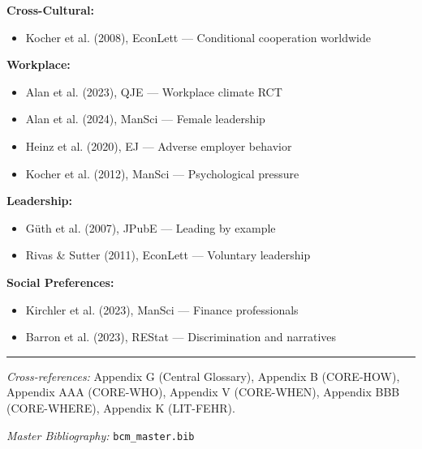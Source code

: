 \textbf{Cross-Cultural:}
\begin{itemize}[nosep]
\item Kocher et al. (2008), EconLett --- Conditional cooperation worldwide
\end{itemize}

\textbf{Workplace:}
\begin{itemize}[nosep]
\item Alan et al. (2023), QJE --- Workplace climate RCT
\item Alan et al. (2024), ManSci --- Female leadership
\item Heinz et al. (2020), EJ --- Adverse employer behavior
\item Kocher et al. (2012), ManSci --- Psychological pressure
\end{itemize}

\textbf{Leadership:}
\begin{itemize}[nosep]
\item G\"uth et al. (2007), JPubE --- Leading by example
\item Rivas \& Sutter (2011), EconLett --- Voluntary leadership
\end{itemize}

\textbf{Social Preferences:}
\begin{itemize}[nosep]
\item Kirchler et al. (2023), ManSci --- Finance professionals
\item Barron et al. (2023), REStat --- Discrimination and narratives
\end{itemize}

\nocite{bcm_master}



\vspace{1em}
\hrule
\vspace{0.5em}

\noindent\textit{Cross-references:}
Appendix G (Central Glossary),
Appendix B (CORE-HOW),
Appendix AAA (CORE-WHO),
Appendix V (CORE-WHEN),
Appendix BBB (CORE-WHERE),
Appendix K (LIT-FEHR).

\noindent\textit{Master Bibliography:} \texttt{bcm\_master.bib}


